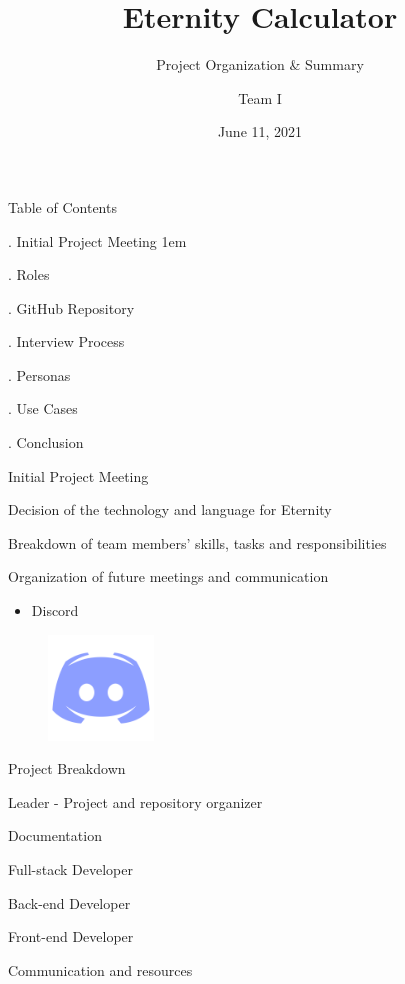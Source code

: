 \documentclass[12pt]{beamer}
\title{Eternity Calculator}
\subtitle{Project Organization \& Summary}
\author{Team I}
\institute{COMP 354 - Summer 2021}
\date{June 11, 2021}
\begin{document}
\begin{frame}[plain]
\maketitle
\end{frame}

\begin{frame}{Table of Contents}
  \item {. Initial Project Meeting}
  \itemsep1em
  \item {. Roles}
  \item {. GitHub Repository}
  \item {. Interview Process}
  \item {. Personas}
  \item {. Use Cases}
  \item {. Conclusion}
\end{frame}

\begin{frame}{Initial Project Meeting}
 \begin{fullpageitemize}
    \item Decision of the technology and language for Eternity \pause
    \item Breakdown of team members' skills, tasks and responsibilities \pause
    \item Organization of future meetings and communication
    \begin{itemize}
        \item Discord 
    \end{itemize}
     \begin{figure}
     \centering
     \includegraphics[width=0.25\textwidth]{images/discord.png}       \end{figure}
 \end{fullpageitemize}
\end{frame}

\begin{frame}{Project Breakdown}
 \begin{fullpageitemize}
    \item Leader - Project and repository organizer
    \item Documentation
    \item Full-stack Developer
    \item Back-end Developer
    \item Front-end Developer
    \item Communication and resources
 \end{fullpageitemize}
\end{frame}
\end{document}
